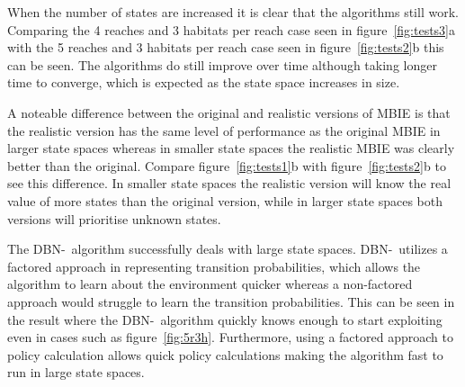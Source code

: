 When the number of states are increased it is clear that the algorithms still
work. Comparing the 4 reaches and 3 habitats per reach case seen in
figure~\ref{fig:tests3}a with the 5 reaches and 3 habitats per reach case seen
in figure~\ref{fig:tests2}b this can be seen. The algorithms do still improve
over time although taking longer time to converge, which is expected as the
state space increases in size. 

A noteable difference between the original and realistic versions of MBIE is
that the realistic version has the same level of performance as the original
MBIE in larger state spaces whereas in smaller state spaces the realistic MBIE
was clearly better than the original. Compare figure~\ref{fig:tests1}b with
figure~\ref{fig:tests2}b to see this difference. In smaller state spaces the
realistic version will know the real value of more states than the original
version, while in larger state spaces both versions will prioritise unknown
states.

The DBN-\etre\ algorithm successfully deals with large state spaces. DBN-\etre\
utilizes a factored approach in representing transition probabilities, which
allows the algorithm to learn about the environment quicker whereas a
non-factored approach would struggle to learn the transition probabilities.
This can be seen in the result where the DBN-\etre\ algorithm quickly knows
enough to start exploiting even in cases such as figure~\ref{fig:5r3h}.
Furthermore, using a factored approach to policy calculation allows quick
policy calculations making the algorithm fast to run in large state spaces.
